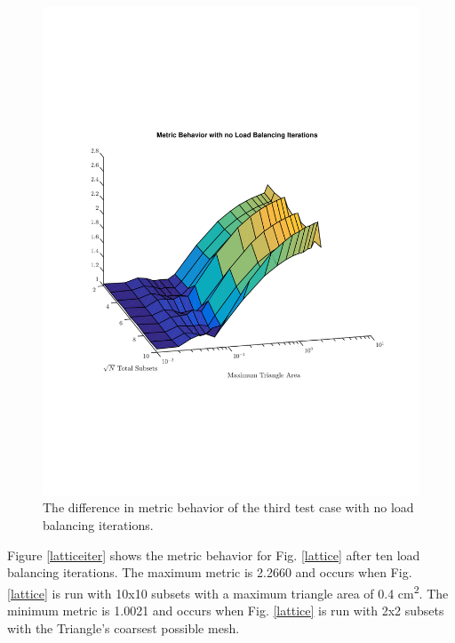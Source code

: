 \documentclass{anstrans}
\begin{document}
\begin{figure}[H]
\centering
\includegraphics[scale=0.50, trim = 2cm 6cm 2cm 7cm,clip]{figures/lattice_no_iter.pdf}
\caption{The difference in metric behavior of the third test case with no load balancing iterations.}
\label{latticenoiter}
\end{figure}

Figure \ref{latticeiter} shows the metric behavior for Fig. \ref{lattice} after ten load balancing iterations. The maximum metric is 2.2660 and occurs when Fig. \ref{lattice} is run with 10x10 subsets with a maximum triangle area of 0.4 cm\textsuperscript{2}. The minimum metric is 1.0021 and occurs when Fig. \ref{lattice} is run with 2x2 subsets with the Triangle's coarsest possible mesh.
\end{document}
